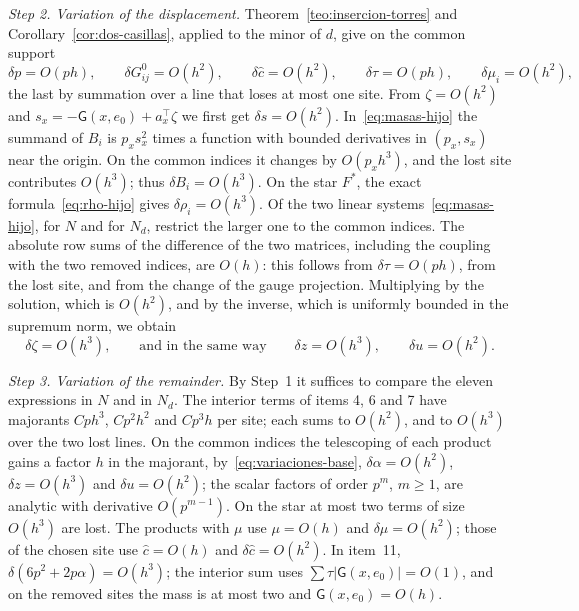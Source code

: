 
\emph{Step 2. Variation of the displacement.} Theorem~\ref{teo:insercion-torres} and
Corollary~\ref{cor:dos-casillas}, applied to the minor of $d$, give on the common support
\begin{equation}\label{eq:variaciones-base}
 \delta p=O(ph),\qquad \delta G^0_{ij}=O(h^2),\qquad \delta\hat c=O(h^2),\qquad
 \delta\tau=O(ph),\qquad \delta\mu_i=O(h^2),
\end{equation}
the last by summation over a line that loses at most one site. From $\zeta=O(h^2)$ and
$s_x=-\mathsf G(x,e_0)+a_x^\top\zeta$ we first get $\delta s=O(h^2)$. In~\eqref{eq:masas-hijo} the summand
of $B_i$ is $p_xs_x^2$ times a function with bounded derivatives in $(p_x,s_x)$ near the origin. On the
common indices it changes by $O(p_xh^3)$, and the lost site contributes $O(h^3)$; thus $\delta
B_i=O(h^3)$. On the star $F^*$, the exact formula~\eqref{eq:rho-hijo} gives $\delta\rho_i=O(h^3)$. Of the
two linear systems~\eqref{eq:masas-hijo}, for $N$ and for $N_d$, restrict the larger one to the common
indices. The absolute row sums of the difference of the two matrices, including the coupling with the two
removed indices, are $O(h)$: this follows from $\delta\tau=O(ph)$, from the lost site, and from the change
of the gauge projection. Multiplying by the solution, which is $O(h^2)$, and by the inverse, which is
uniformly bounded in the supremum norm, we obtain
\[
 \delta\zeta=O(h^3),\qquad\text{and in the same way}\qquad \delta z=O(h^3),\qquad \delta u=O(h^2).
\]

\emph{Step 3. Variation of the remainder.} By Step~1 it suffices to compare the eleven expressions in $N$
and in $N_d$. The interior terms of items 4, 6 and 7 have majorants $Cph^3$, $Cp^2h^2$ and $Cp^3h$ per
site; each sums to $O(h^2)$, and to $O(h^3)$ over the two lost lines. On the common indices the
telescoping of each product gains a factor $h$ in the majorant, by~\eqref{eq:variaciones-base},
$\delta\alpha=O(h^2)$, $\delta z=O(h^3)$ and $\delta u=O(h^2)$; the scalar factors of order $p^m$, $m\ge1$,
are analytic with derivative $O(p^{m-1})$. On the star at most two terms of size $O(h^3)$ are lost. The
products with $\mu$ use $\mu=O(h)$ and $\delta\mu=O(h^2)$; those of the chosen site use $\hat c=O(h)$ and
$\delta\hat c=O(h^2)$. In item~11, $\delta(6p^2+2p\alpha)=O(h^3)$; the interior sum uses
$\sum\tau|\mathsf G(x,e_0)|=O(1)$, and on the removed sites the mass is at most two and $\mathsf
G(x,e_0)=O(h)$.

